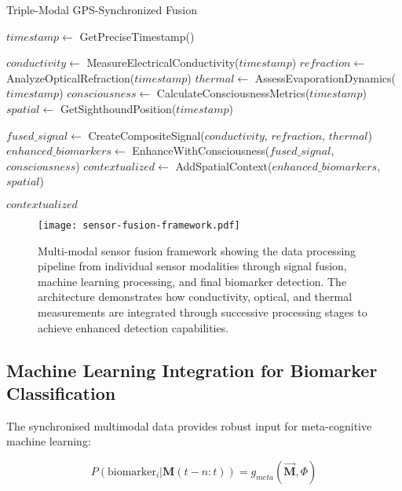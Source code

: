 \documentclass[12pt,a4paper]{article}
\begin{document}
\begin{algorithm}
\caption{Triple-Modal GPS-Synchronized Fusion}
\begin{algorithmic}[1]
        \State $timestamp \gets$ GetPreciseTimestamp()
        
        \State $conductivity \gets$ MeasureElectricalConductivity($timestamp$)
        \State $refraction \gets$ AnalyzeOpticalRefraction($timestamp$)
        \State $thermal \gets$ AssessEvaporationDynamics($timestamp$)
        \State $consciousness \gets$ CalculateConsciousnessMetrics($timestamp$)
        \State $spatial \gets$ GetSighthoundPosition($timestamp$)
        
        \State $fused\_signal \gets$ CreateCompositeSignal($conductivity$, $refraction$, $thermal$)
        \State $enhanced\_biomarkers \gets$ EnhanceWithConsciousness($fused\_signal$, $consciousness$)
        \State $contextualized \gets$ AddSpatialContext($enhanced\_biomarkers$, $spatial$)
        
        \State \Return $contextualized$
    \EndIf
\EndProcedure
\end{algorithmic}
\end{algorithm}

\begin{figure}[htbp]
\centering
\texttt{[image: sensor-fusion-framework.pdf]}
\caption{Multi-modal sensor fusion framework showing the data processing pipeline from individual sensor modalities through signal fusion, machine learning processing, and final biomarker detection. The architecture demonstrates how conductivity, optical, and thermal measurements are integrated through successive processing stages to achieve enhanced detection capabilities.}
\label{fig:sensor-fusion-framework}
\end{figure}

\subsection{Machine Learning Integration for Biomarker Classification}

The synchronised multimodal data provides robust input for meta-cognitive machine learning:

\begin{equation}
P(\text{biomarker}_i | \mathbf{M}(t-n:t)) = g_{meta}(\vec{\mathbf{M}}, \Phi)
\end{equation}
\end{document}
